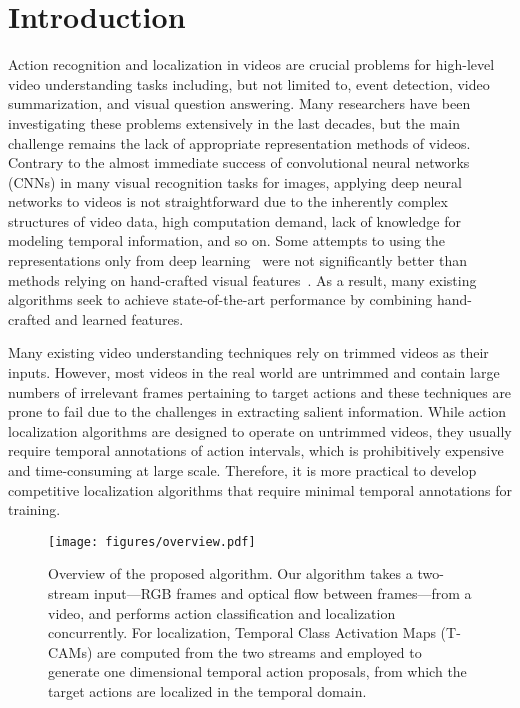\documentclass[10pt,twocolumn,letterpaper]{article}
\begin{document}
\section{Introduction}
\label{sec:introduction}
Action recognition and localization in videos are crucial problems for high-level video understanding tasks including, but not limited to, event detection, video summarization, and visual question answering.
Many researchers have been investigating these problems extensively in the last decades, but the main challenge remains the lack of appropriate representation methods of videos.
Contrary to the almost immediate success of convolutional neural networks (CNNs) in many visual recognition tasks for images, applying deep neural networks to videos is not straightforward due to the inherently complex structures of video data, high computation demand, lack of knowledge for modeling temporal information, and so on.
Some attempts to using the representations only from deep learning~\cite{karpathy14large,simonyan14two,tran15learning,wang16temporal} were not significantly better than methods relying on hand-crafted visual features~\cite{laptive05on,wang13action,wang13motionlets}.
As a result, many existing algorithms seek to achieve state-of-the-art performance by combining hand-crafted and learned features.



Many existing video understanding techniques rely on trimmed videos as their inputs. However, most videos in the real world are untrimmed and contain large numbers of irrelevant frames pertaining to target actions and these techniques are prone to fail due to the challenges in extracting salient information. While action localization algorithms are designed to operate on untrimmed videos, they usually require temporal annotations of action intervals, which is prohibitively expensive and time-consuming at large scale. Therefore, it is more practical to develop competitive localization algorithms that require minimal temporal annotations for training.

\begin{figure}[t]
\captionsetup{font=small}
\centering
\texttt{[image: figures/overview.pdf]}
\caption{Overview of the proposed algorithm. Our algorithm takes a two-stream input---RGB frames and optical flow between frames---from a video, and performs action classification and localization concurrently. For localization, Temporal Class Activation Maps (T-CAMs) are computed from the two streams and employed to generate one dimensional temporal action proposals, from which the target actions are localized in the temporal domain.}
\label{fig:overview}
\end{figure}
\end{document}

